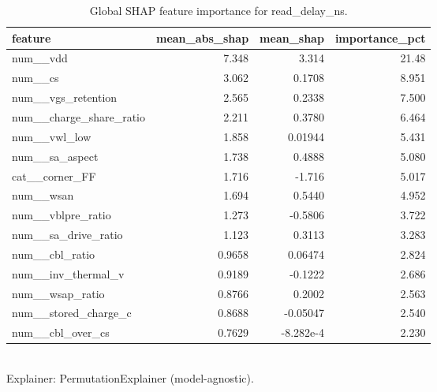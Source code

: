 \begin{table}[!t]
\centering
\caption{Global SHAP feature importance for read_delay_ns.}
\label{tab:xai_shap_importance_read_delay_ns}
\footnotesize
\begin{tabular}{lrrr}
\toprule
feature & mean\_abs\_shap & mean\_shap & importance\_pct \\
\midrule
num\_\_vdd & 7.348 & 3.314 & 21.48 \\
num\_\_cs & 3.062 & 0.1708 & 8.951 \\
num\_\_vgs\_retention & 2.565 & 0.2338 & 7.500 \\
num\_\_charge\_share\_ratio & 2.211 & 0.3780 & 6.464 \\
num\_\_vwl\_low & 1.858 & 0.01944 & 5.431 \\
num\_\_sa\_aspect & 1.738 & 0.4888 & 5.080 \\
cat\_\_corner\_FF & 1.716 & -1.716 & 5.017 \\
num\_\_wsan & 1.694 & 0.5440 & 4.952 \\
num\_\_vblpre\_ratio & 1.273 & -0.5806 & 3.722 \\
num\_\_sa\_drive\_ratio & 1.123 & 0.3113 & 3.283 \\
num\_\_cbl\_ratio & 0.9658 & 0.06474 & 2.824 \\
num\_\_inv\_thermal\_v & 0.9189 & -0.1222 & 2.686 \\
num\_\_wsap\_ratio & 0.8766 & 0.2002 & 2.563 \\
num\_\_stored\_charge\_c & 0.8688 & -0.05047 & 2.540 \\
num\_\_cbl\_over\_cs & 0.7629 & -8.282e-4 & 2.230 \\
\bottomrule
\end{tabular}
\\[2pt] \footnotesize Explainer: PermutationExplainer (model-agnostic).
\end{table}
